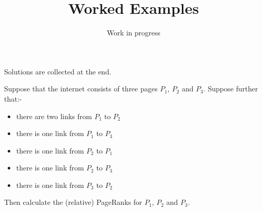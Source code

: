 \documentclass{article}
\title{Worked Examples}
\author{Work in progress}
\begin{document}
\maketitle
Solutions are collected at the end.

\begin{Exercise}
  Suppose that the internet consists of three pages $P_1$, $P_2$ and $P_3$.
  Suppose further that:-
  \begin{itemize}
    \item there are two links from $P_1$ to $P_2$
    \item there is one link from $P_1$ to $P_3$
    \item there is one link from $P_2$ to $P_1$
    \item there is one link from $P_2$ to $P_3$
    \item there is one link from $P_3$ to $P_2$
  \end{itemize}
  Then calculate the (relative) PageRanks for $P_1$, $P_2$ and $P_3$.
\end{Exercise}
\end{document}
